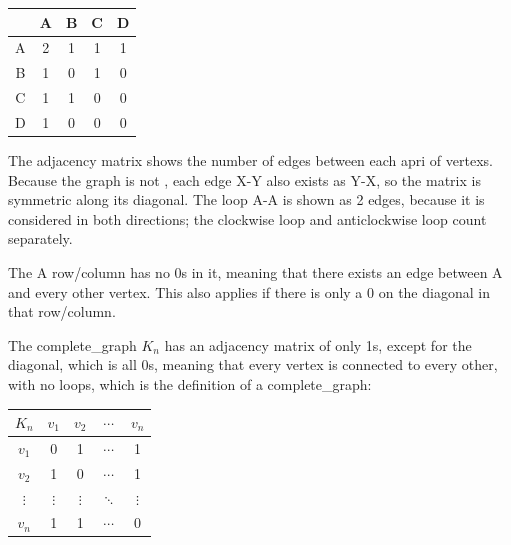                 \begin{center}
                    \begin{tabular}{c|c c c c}
                          & A & B & C & D \\
                        \hline
                        A & 2 & 1 & 1 & 1  \\
                        B & 1 & 0 & 1 & 0  \\
                        C & 1 & 1 & 0 & 0  \\
                        D & 1 & 0 & 0 & 0
                    \end{tabular}
                \end{center}
                The adjacency matrix shows the number of \glspl{edge} between each apri of \glspl{vertex}.
                Because the \gls{graph} is not , each \gls{edge} X-Y also exists as Y-X, so the matrix is symmetric along its diagonal.
                The \gls{loop} A-A is shown as 2 \glspl{edge}, because it is considered in both directions; the clockwise \gls{loop} and anticlockwise \gls{loop} count separately.
                
                The A row/column has no 0s in it, meaning that there exists an \gls{edge} between A and every other \gls{vertex}.
                This also applies if there is only a 0 on the diagonal in that row/column.

                The \gls{complete_graph} $K_n$ has an adjacency matrix of only 1s, except for the diagonal, which is all 0s, meaning that every \gls{vertex} is connected to every other, with no \glspl{loop}, which is the definition of a \gls{complete_graph}:
                \begin{center}
                    \begin{tabular}{c|c c c c}
                        $K_n$  & $v_1$ & $v_2$ & $\cdots$ & $v_n$ \\
                        \hline
                        $v_1$ & 0 & 1 & $\cdots$ & 1  \\
                        $v_2$ & 1 & 0 & $\cdots$ & 1  \\
                        $\vdots$ & $\vdots$ & $\vdots$ & $\ddots$ & $\vdots$  \\
                        $v_n$ & 1 & 1 & $\cdots$ & 0
                    \end{tabular}
                \end{center}
                
